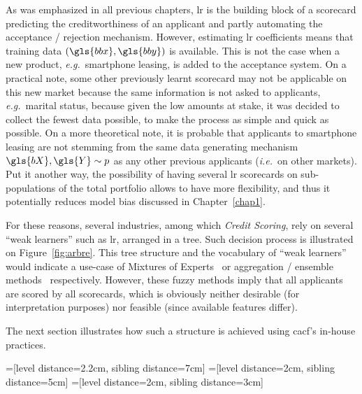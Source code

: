 As was emphasized in all previous chapters, \gls{lr} is the building block of a scorecard predicting the creditworthiness of an applicant and partly automating the acceptance / rejection mechanism. However, estimating \gls{lr} coefficients means that training data $(\gls{bbx},\gls{bby})$ is available. This is not the case when a new product, \textit{e.g.}\ smartphone leasing, is added to the acceptance system. On a practical note, some other previously learnt scorecard may not be applicable on this new market because the same information is not asked to applicants, \textit{e.g.}\ marital status, because given the low amounts at stake, it was decided to collect the fewest data possible, to make the process as simple and quick as possible. On a more theoretical note, it is probable that applicants to smartphone leasing are not stemming from the same data generating mechanism $\gls{bX},\gls{Y} \sim p$ as any other previous applicants (\textit{i.e.}\ on other markets). Put it another way, the possibility of having several \gls{lr} scorecards on sub-populations of the total portfolio allows to have more flexibility, and thus it potentially reduces model bias discussed in Chapter~\ref{chap1}.

For these reasons, several industries, among which \textit{Credit Scoring}, rely on several ``weak learners'' such as \gls{lr}, arranged in a tree. Such decision process is illustrated on Figure~\ref{fig:arbre}. This tree structure and the vocabulary of ``weak learners'' would indicate a use-case of Mixtures of Experts~\cite{jordan1994hierarchical} or aggregation / ensemble methods~\cite{opitz1999popular} respectively. However, these fuzzy methods imply that all applicants are scored by all scorecards, which is obviously neither desirable (for interpretation purposes) nor feasible (since available features differ).

The next section illustrates how such a structure is achieved using \gls{cacf}'s in-house practices.

=[level distance=2.2cm, sibling distance=7cm]
=[level distance=2cm, sibling distance=5cm]
=[level distance=2cm, sibling distance=3cm]

